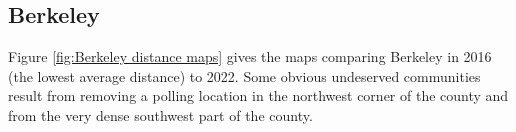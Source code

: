 \documentclass[11pt]{article}
\theoremstyle{remark}
\theoremstyle{definition}
\begin{document}

\subsection{Berkeley}
Figure \ref{fig:Berkeley distance maps} gives the maps comparing Berkeley in 2016 (the lowest average distance) to 2022. Some obvious undeserved communities result from removing a polling location in the northwest corner of the county and from the very dense southwest part of the county.
\end{document}
